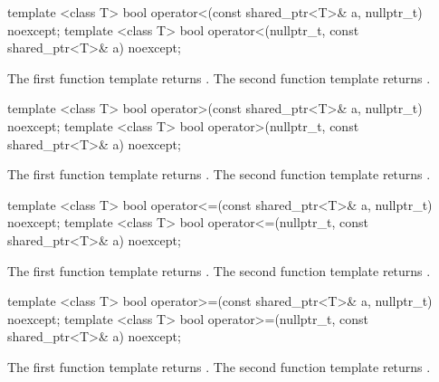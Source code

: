 %
\begin{itemdecl}
template <class T>
  bool operator<(const shared_ptr<T>& a, nullptr_t) noexcept;
template <class T>
  bool operator<(nullptr_t, const shared_ptr<T>& a) noexcept;
\end{itemdecl}

\begin{itemdescr}
\pnum
\returns
The first function template returns
.
The second function template returns
.
\end{itemdescr}

%
\begin{itemdecl}
template <class T>
  bool operator>(const shared_ptr<T>& a, nullptr_t) noexcept;
template <class T>
  bool operator>(nullptr_t, const shared_ptr<T>& a) noexcept;
\end{itemdecl}

\begin{itemdescr}
\pnum
\returns
The first function template returns .
The second function template returns .
\end{itemdescr}

%
\begin{itemdecl}
template <class T>
  bool operator<=(const shared_ptr<T>& a, nullptr_t) noexcept;
template <class T>
  bool operator<=(nullptr_t, const shared_ptr<T>& a) noexcept;
\end{itemdecl}

\begin{itemdescr}
\pnum
\returns
The first function template returns .
The second function template returns .
\end{itemdescr}

%
\begin{itemdecl}
template <class T>
  bool operator>=(const shared_ptr<T>& a, nullptr_t) noexcept;
template <class T>
  bool operator>=(nullptr_t, const shared_ptr<T>& a) noexcept;
\end{itemdecl}

\begin{itemdescr}
\pnum
\returns
The first function template returns .
The second function template returns .
\end{itemdescr}

